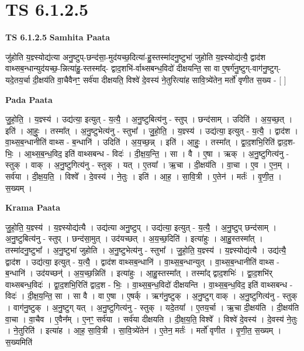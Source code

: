 \documentclass[17pt]{extarticle}
\begin{document}
\section{ TS 6.1.2.5 }

\textbf{TS 6.1.2.5 } \newline
\textbf{Samhita Paata} \newline

जु॑होति य॒ज्ञ्स्योद्य॑त्या अनु॒ष्टुप्-छन्द॑सा॒-मुद॑यच्छ॒दित्या॑-हु॒स्तस्मा॑दनु॒ष्टुभा॑ जुहोति य॒ज्ञ्स्योद्य॑त्यै॒ द्वाद॑श वाथ्सब॒न्धान्युद॑यच्छ॒-न्नित्या॑हु॒-स्तस्मा᳚द्- द्वाद॒शभि॑-र्वाथ्सबन्ध॒विदो॑ दीक्षयन्ति॒ सा वा ए॒षर्ग॑नु॒ष्टुग्-वाग॑नु॒ष्टुग्-यदे॒तय॒र्चा दी॒क्षय॑ति वा॒चैवैनꣳ॒॒ सर्व॑या दीक्षयति॒ विश्वे॑ दे॒वस्य॑ ने॒तुरित्या॑ह सावि॒त्र्ये॑तेन॒ मर्तो॑ वृणीत स॒ख्य - [  ] \newline

\textbf{Pada Paata} \newline

जु॒हो॒ति॒ । य॒ज्ञ्स्य॑ । उद्य॑त्या॒ इत्युत् - य॒त्यै॒ । अ॒नु॒ष्टुबित्य॑नु - स्तुप् । छन्द॑साम् । उदिति॑ । अ॒य॒च्छ॒त् । इति॑ । आ॒हुः॒ । तस्मा᳚त् । अ॒नु॒ष्टुभेत्य॑नु - स्तुभा᳚ । जु॒हो॒ति॒ । य॒ज्ञ्स्य॑ । उद्य॑त्या॒ इत्युत् - य॒त्यै॒ । द्वाद॑श । वा॒थ्स॒ब॒न्धानीति॑ वाथ्स - ब॒न्धानि॑ । उदिति॑ । अ॒य॒च्छ॒न्न् । इति॑ । आ॒हुः॒ । तस्मा᳚त् । द्वा॒द॒शभि॒रिति॑ द्वाद॒श-भिः॒ । आ॒थ्स॒ब॒न्ध॒विद॒ इति॑ वाथ्सबन्ध - विदः॑ । दी॒क्ष॒य॒न्ति॒ । सा । वै । ए॒षा । ऋक् । अ॒नु॒ष्टुगित्य॑नु - स्तुक् । वाक् । अ॒नु॒ष्टुगित्य॑नु - स्तुक् । यत् । ए॒तया᳚ । ऋ॒चा । दी॒क्षय॑ति । वा॒चा । ए॒व । ए॒न॒म् । सर्व॑या । दी॒क्ष॒य॒ति॒ । विश्वे᳚ । दे॒वस्य॑ । ने॒तुः । इति॑ । आ॒ह॒ । सा॒वि॒त्री । ए॒तेन॑ । मर्तः॑ । वृ॒णी॒त॒ । स॒ख्यम् ।  \newline


\textbf{Krama Paata} \newline

जु॒हो॒ति॒ य॒ज्ञ्स्य॑ । य॒ज्ञ्स्योद्य॑त्यै । उद्य॑त्या अनु॒ष्टुप् । उद्य॑त्या॒ इत्युत् - य॒त्यै॒ । अ॒नु॒ष्टुप् छन्द॑साम् । अ॒नु॒ष्टुबित्य॑नु - स्तुप् । छन्द॑सा॒मुत् । उद॑यच्छत् । अ॒य॒च्छ॒दिति॑ । इत्या॑हुः । आ॒हु॒स्तस्मा᳚त् । तस्मा॑दनु॒ष्टुभा᳚ । अ॒नु॒ष्टुभा॑ जुहोति । अ॒नु॒ष्टुभेत्य॑नु - स्तुभा᳚ । जु॒हो॒ति॒ य॒ज्ञ्स्य॑ । य॒ज्ञ्स्योद्य॑त्यै । उद्य॑त्यै॒ द्वाद॑श । उद्य॑त्या॒ इत्युत् - य॒त्यै॒ । द्वाद॑श वाथ्सब॒न्धानि॑ । वा॒थ्स॒ब॒न्धान्युत् । वा॒थ्स॒ब॒न्धानीति॑ वाथ्स - ब॒न्धानि॑ । उद॑यच्छन्॑ । अ॒य॒च्छ॒न्निति॑ । इत्या॑हुः । आ॒हु॒स्तस्मा᳚त् । तस्मा᳚द् द्वाद॒शभिः॑ । द्वा॒द॒शभि॑र् वाथ्सबन्ध॒विदः॑ । द्वा॒द॒शभि॒रिति॑ द्वाद॒श - भिः॒ । वा॒थ्स॒ब॒न्ध॒विदो॑ दीक्षयन्ति । वा॒थ्स॒ब॒न्ध॒विद॒ इति॑ वाथ्सबन्ध - विदः॑ । दी॒क्ष॒य॒न्ति॒ सा । सा वै । वा ए॒षा । ए॒षर्क् । ऋग॑नु॒ष्टुक् । अ॒नु॒ष्टुग् वाक् । अ॒नु॒ष्टुगित्य॑नु - स्तुक् । वाग॑नु॒ष्टुक् । अ॒नु॒ष्टुग् यत् । अ॒नु॒ष्टुगित्य॑नु - स्तुक् । यदे॒तया᳚ । ए॒तय॒र्चा । ऋ॒चा दी॒क्षय॑ति । दी॒क्षय॑ति वा॒चा । वा॒चैव । ए॒वैन᳚म् । ए॒नꣳ॒॒ सर्व॑या । सर्व॑या दीक्षयति । दी॒क्ष॒य॒ति॒ विश्वे᳚ । विश्वे॑ दे॒वस्य॑ । दे॒वस्य॑ ने॒तुः । ने॒तुरिति॑ । इत्या॑ह । आ॒ह॒ सा॒वि॒त्री । सा॒वि॒त्र्ये॑तेन॑ । ए॒तेन॒ मर्तः॑ । मर्तो॑ वृणीत । वृ॒णी॒त॒ स॒ख्यम् । स॒ख्यमिति॑ \newline
\end{document}

